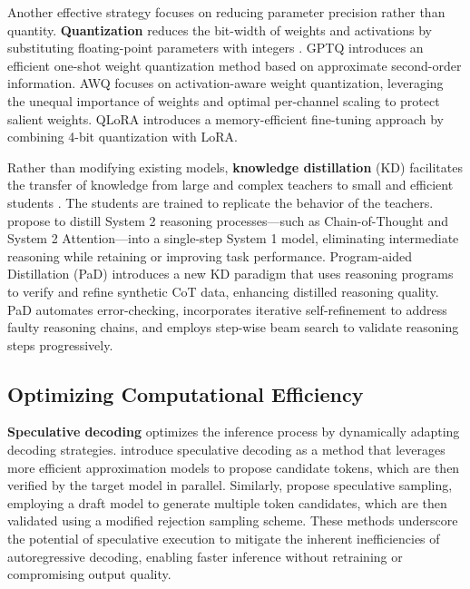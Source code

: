     Another effective strategy focuses on reducing parameter precision rather than quantity. \textbf{Quantization} reduces the bit-width of weights and activations by substituting floating-point parameters with integers \cite{gupta2015deep, nagel2020up}.
    GPTQ \cite{frantar2022gptq} introduces an efficient one-shot weight quantization method based on approximate second-order information. 
    AWQ \cite{lin2024awq} focuses on activation-aware weight quantization, leveraging the unequal importance of weights and optimal per-channel scaling to protect salient weights.
    QLoRA \cite{dettmers2024qlora} introduces a memory-efficient fine-tuning approach by combining 4-bit quantization with LoRA. 

    Rather than modifying existing models, \textbf{knowledge distillation} (KD) facilitates the transfer of knowledge from large and complex teachers to small and efficient students \cite{hinton2015distilling}. The students are trained to replicate the behavior of the teachers.
    \citet{yu2024distilling} propose to distill System 2 reasoning processes—such as Chain-of-Thought and System 2 Attention—into a single-step System 1 model, eliminating intermediate reasoning while retaining or improving task performance.
    Program-aided Distillation (PaD) \cite{zhu2024pad} introduces a new KD paradigm that uses reasoning programs to verify and refine synthetic CoT data, enhancing distilled reasoning quality. PaD automates error-checking, incorporates iterative self-refinement to address faulty reasoning chains, and employs step-wise beam search to validate reasoning steps progressively.

\subsection{Optimizing Computational Efficiency} \label{sec:scaling_down:computing}

    \textbf{Speculative decoding} optimizes the inference process by dynamically adapting decoding strategies.
    \citet{leviathan2023fast} introduce speculative decoding as a method that leverages more efficient approximation models to propose candidate tokens, which are then verified by the target model in parallel. 
    Similarly, \citet{chen2023accelerating} propose speculative sampling, employing a draft model to generate multiple token candidates, which are then validated using a modified rejection sampling scheme. 
    These methods underscore the potential of speculative execution to mitigate the inherent inefficiencies of autoregressive decoding, enabling faster inference without retraining or compromising output quality.
    
